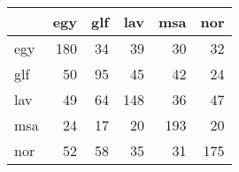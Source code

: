 \begin{tabular}{lrrrrr}
\hline
     &   egy &   glf &   lav &   msa &   nor \\
\hline
 egy &   180 &    34 &    39 &    30 &    32 \\
 glf &    50 &    95 &    45 &    42 &    24 \\
 lav &    49 &    64 &   148 &    36 &    47 \\
 msa &    24 &    17 &    20 &   193 &    20 \\
 nor &    52 &    58 &    35 &    31 &   175 \\
\hline
\end{tabular}